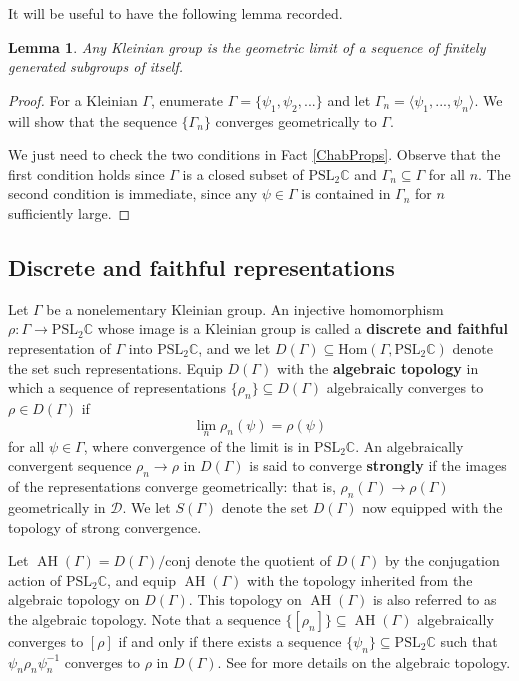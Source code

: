 \documentclass[11pt,leqno]{article}
\DeclareMathOperator{\AH}{AH}
\newtheorem{lemma}{Lemma}
\theoremstyle{introdef}
\numberwithin{lemma}{section}
\theoremstyle{definition}
\newcommand{\C}{\mathbb{C}}
\begin{document}
It will be useful to have the following lemma recorded.

\begin{lemma}
\label{fglim}
    Any Kleinian group is the geometric limit of a sequence of finitely generated subgroups of itself.
\end{lemma}
\begin{proof}
For a Kleinian $\Gamma$, enumerate $\Gamma=\{\psi_1,\psi_2,...\}$ and let $\Gamma_n=\langle\psi_1,...,\psi_n\rangle$. We will show that the sequence $\{\Gamma_n\}$ converges geometrically to $\Gamma$.\par

We just need to check the two conditions in Fact \ref{ChabProps}. Observe that the first condition holds since $\Gamma$ is a closed subset of $\mathrm{PSL}_2\mathbb{C}$ and $\Gamma_n\subseteq\Gamma$ for all $n$. The second condition is immediate, since any $\psi\in\Gamma$ is contained in $\Gamma_n$ for $n$ sufficiently large.
\end{proof}


\subsection{Discrete and faithful representations}
\label{Sec-Reps}


Let $\Gamma$ be a nonelementary Kleinian group. An injective homomorphism $\rho:\Gamma\rightarrow\mathrm{PSL}_2\C$ whose image is a Kleinian group is called a \textbf{discrete and faithful} representation of $\Gamma$ into $\mathrm{PSL}_2\C$, and we let $D(\Gamma)\subseteq\mathrm{Hom}(\Gamma,\mathrm{PSL}_2\C)$ denote the set such representations. Equip $D(\Gamma)$ with the \textbf{algebraic topology} in which a sequence of representations $\{\rho_n\}\subseteq D(\Gamma)$ algebraically converges to $\rho\in D(\Gamma)$ if \[\lim_n \rho_n(\psi)=\rho(\psi)\] for all $\psi\in\Gamma$, where convergence of the limit is in $\mathrm{PSL}_2\C$. An algebraically convergent sequence $\rho_n\rightarrow\rho$ in $D(\Gamma)$ is said to converge \textbf{strongly} if the images of the representations converge geometrically: that is, $\rho_n(\Gamma)\rightarrow\rho(\Gamma)$ geometrically in $\mathcal{D}$. We let $S(\Gamma)$ denote the set $D(\Gamma)$ now equipped with the topology of strong convergence. \par


Let $\AH(\Gamma)=D(\Gamma)/\text{conj}$ denote the quotient of $D(\Gamma)$ by the conjugation action of $\mathrm{PSL}_2\C$, and equip $\AH(\Gamma)$ with the topology inherited from the algebraic topology on $D(\Gamma)$. This topology on $\AH(\Gamma)$ is also referred to as the algebraic topology. Note that a sequence $\{[\rho_n]\}\subseteq \AH(\Gamma)$ algebraically converges to $[\rho]$ if and only if there exists a sequence $\{\psi_n\}\subseteq\mathrm{PSL}_2\C$ such that $\psi_n\rho_n\psi_n^{-1}$ converges to $\rho$ in $D(\Gamma)$. See \cite{MAT} for more details on the algebraic topology.\par
\end{document}

